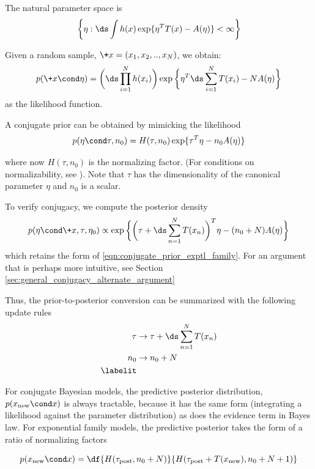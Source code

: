 \documentclass{article} %
\begin{document}
The natural parameter space is 
\[  \bigg\{\eta : \ds\int h(x) \exp \{ \eta^T T(x) - A(\eta) \} < \infty \bigg \}\]

Given a random sample, $\+x=(x_1, x_2, .., x_N)$, we obtain:
\[ p(\+x \cond \eta) = \bigg( \ds\prod_{i=1}^N h(x_i)  \bigg) \exp \bigg\{ \eta^T  \ds\sum_{i=1}^N T(x_i) - N A(\eta) \bigg\} \]
as the likelihood function.

A conjugate prior can be obtained by mimicking the likelihood
\begin{equation}
p (\eta \cond \tau, n_0) = H(\tau, n_0) \exp \{ \tau^T \eta - n_0 A(\eta)\}
\label{eqn:conjugate_prior_exptl_family}
\end{equation}

where now $H(\tau, n_0)$ is the normalizing factor.  (For conditions on normalizability, see \cite{jordan_ef}).   Note that $\tau$ has the dimensionality of the canonical parameter $\eta$ and $n_0$ is a scalar.

To verify conjugacy, we compute the posterior density
\[ p (\eta \cond \+x, \tau, \eta_0)  \propto \exp \bigg\{ \bigg( \tau + \ds\sum_{n=1}^N  T(x_n) \bigg)^T \eta - (n_0 + N) A(\eta) \bigg\} \]
which retains the form of \eqref{eqn:conjugate_prior_exptl_family}.  For an argument that is perhaps more intuitive, see Section \ref{sec:general_conjugacy_alternate_argument} 

Thus, the prior-to-posterior conversion can be summarized with the following update rules
\begin{align*}
\tau & \to \tau + \ds\sum_{n=1}^N T(x_n) \\
n_0 & \to  n_0 + N \\
\labelit \label{eqn:general_formalism_prior_to_posterior_conversion}
\end{align*}

For conjugate Bayesian models, the predictive posterior distribution, $p(x_{\text{new}} \cond x)$ is always tractable, because it has the same form (integrating a likelihood against the parameter distribution) as does the evidence term in Bayes law.   For exponential family models, the predictive posterior takes the form of a ratio of normalizing factors

\begin{equation}
p(x_{\text{new}} \cond x) = \df{H(\tau_{\text{post}}, n_0 + N)}{H(\tau_{\text{post}} + T(x_{\text{new}}), n_0 + N + 1)}
\label{eqn:predictive_posterior_exptl_family}
\end{equation}

\end{document}

